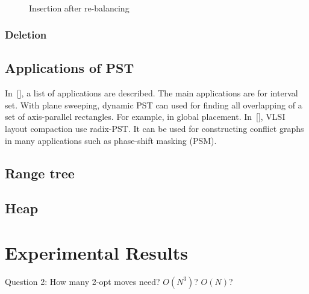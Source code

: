 \documentclass{acm_proc_article-sp}          %
\begin{document}
\begin{figure}[ht]
  \centering
  \\
  \caption{Insertion after re-balancing}\label{fig:pst_insert}
\end{figure}

\subsubsection{Deletion}




\subsection{Applications of PST}
In~[], a list of applications are described. The main applications are
for interval set. With plane sweeping, dynamic PST can used for
finding all overlapping of a set of axis-parallel rectangles. For
example, in global placement. In~[], VLSI layout compaction use
radix-PST. It can be used for constructing conflict graphs in many
applications such as phase-shift masking (PSM).

\subsection{Range tree}

\subsection{Heap}

\subsection{}


\section{Experimental Results}
\label{sec:experiment}
Question 2: How many 2-opt moves need? $O(N^3)$? $O(N)$?
\end{document}

